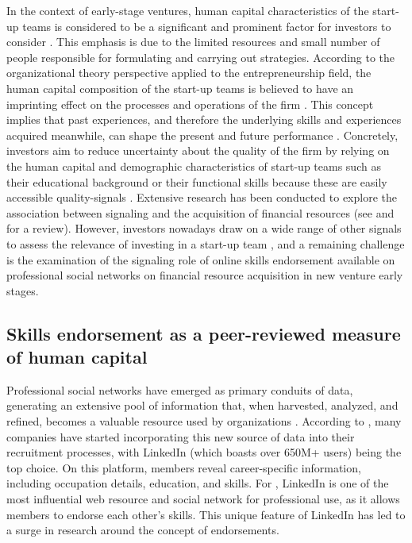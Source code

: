 \documentclass[12pt]{article}
\begin{document}
In the context of early-stage ventures, human capital characteristics of the start-up teams is considered to be a significant and prominent factor for investors to consider \citep{beckman2007early, ko2018signaling, matusik2008values}. This emphasis is due to the limited resources and small number of people responsible for formulating and carrying out strategies. According to the organizational theory perspective applied to the entrepreneurship field, the human capital composition of the start-up teams is believed to have an imprinting effect on the processes and operations of the firm \citep{packalen2007complementing}. This concept implies that past experiences, and therefore the underlying skills and experiences acquired meanwhile, can shape the present and future performance \citep{wu2023secrets}. Concretely, investors aim to reduce uncertainty about the quality of the firm by relying on the human capital and demographic characteristics of start-up teams such as their educational background or their functional skills because these are easily accessible quality-signals \citep{colombo2005founders, beckman2007early, eddleston2016you, plummer2016better}. Extensive research has been conducted to explore the association between signaling and the acquisition of financial resources (see \citet{connelly2011signaling} and \citet{colombo2021use} for a review). However, investors nowadays draw on a wide range of other signals to assess the relevance of investing in a start-up team \citep{banerji2019startup, mollick2014dynamics, courtney2017resolving}, and a remaining challenge is the examination of the signaling role of online skills endorsement available on professional social networks \citep{drakopoulos2020building, perez2016endorsement, rapanta2017linkedin, yan2019social} on financial resource acquisition in new venture early stages.

\subsection{Skills endorsement as a peer-reviewed measure of human capital}

Professional social networks have emerged as primary conduits of data, generating an extensive pool of information that, when harvested, analyzed, and refined, becomes a valuable resource used by organizations \citep{ponte2022use}. According to \citep{urdaneta2021lifelong}, many companies have started incorporating this new source of data into their recruitment processes, with LinkedIn (which boasts over 650M+ users) being the top choice. On this platform, members reveal career-specific information, including occupation details, education, and skills. For \citep{rapanta2017linkedin}, LinkedIn is one of the most influential web resource and social network for professional use, as it allows members to endorse each other's skills. This unique feature of LinkedIn has led to a surge in research around the concept of endorsements.
\end{document}
